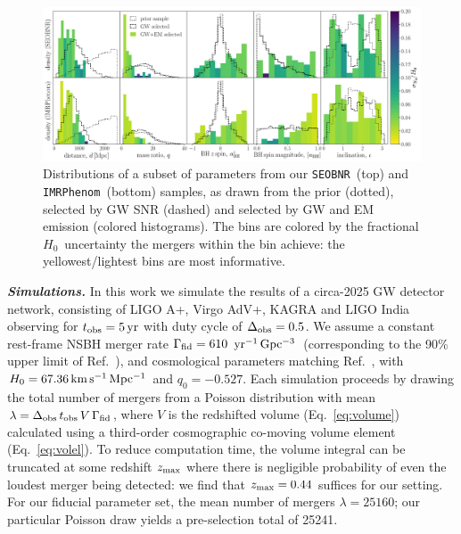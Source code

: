\documentclass[%
 reprint,
 superscriptaddress,
 nofootinbib,
 amsmath,amssymb,
 aps,
]{revtex4-2}
\newcommand{\hubble}{\ensuremath{H_0}}
\newcommand{\decel}{\ensuremath{q_0}}
\newcommand{\zmax}{\ensuremath{z_{\rm max}}}
\newcommand{\tobs}{t_{\rm obs}}
\newcommand{\fobs}{\Delta_{\rm obs}}
\newcommand{\kmsmpc}{\ensuremath{{\rm km\,s^{-1}\,Mpc^{-1}}}}
\newcommand{\yr}{\ensuremath{{\rm yr}}}
\newcommand{\yrgpc}{\ensuremath{{\rm yr^{-1}\,Gpc^{-3}}}}
\newcommand{\seobnr}{\texttt{SEOBNR}}
\newcommand{\imrp}{\texttt{IMRPhenom}}
\begin{document}
\begin{figure}[ht!]
\includegraphics[width=18cm]{fig_1.pdf}
\caption{Distributions of a subset of parameters from our \seobnr\ (top) and \imrp\ (bottom) samples, as drawn from the prior (dotted), selected by GW SNR (dashed) and selected by GW and EM emission (colored histograms). The bins are colored by the fractional \hubble\ uncertainty the mergers within the bin achieve: the yellowest/lightest bins are most informative. \label{fig:pops}}
\end{figure}

\textbf{\emph{Simulations.}} In this work we simulate the results of a circa-2025 GW detector network, consisting of LIGO A+, Virgo AdV+, KAGRA and LIGO India~\cite{Abbott_etal:2013,LVCnoise} observing for $\tobs = 5\,\yr$ with duty cycle of $\fobs=0.5$. We assume a constant rest-frame  NSBH merger rate $\Gamma_{\rm fid} = 610$ \yrgpc\ (corresponding to the 90\% upper limit of Ref.~\cite{Ligo:2018}), and cosmological parameters matching Ref.~\cite{Planck_VI:2018}, with $\hubble=67.36\,\kmsmpc$ and $\decel=-0.527$. Each simulation proceeds by drawing the total number of mergers from a Poisson distribution with mean $\lambda = \fobs \, \tobs \, V \, \Gamma_{\rm fid} $, where $V$ is the redshifted volume (Eq.~\ref{eq:volume}) calculated using a third-order cosmographic co-moving volume element (Eq.~\ref{eq:volel}). To reduce computation time, the volume integral can be truncated at some redshift $\zmax$ where there is negligible probability of even the loudest merger being detected: we find that $\zmax=0.44$ suffices for our setting. For our fiducial parameter set, the mean number of mergers $\lambda = 25160$; our particular Poisson draw yields a pre-selection total of 25241.
\end{document}
